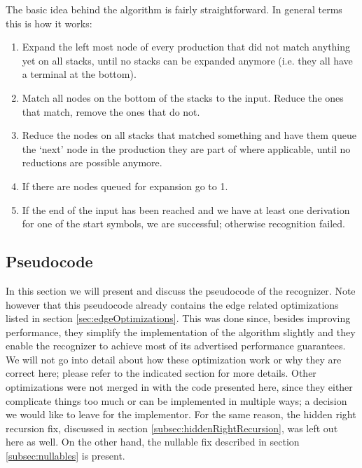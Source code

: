 \documentclass[a4paper,10pt]{article}
\begin{document}
The basic idea behind the algorithm is fairly straightforward. In general terms this is how it works:

\begin{enumerate}
 \setlength{\itemsep}{0pt}
 \setlength{\parskip}{0pt}
 \setlength{\parsep}{0pt}

 \item Expand the left most node of every production that did not match anything yet on all stacks, until no stacks can be expanded anymore (i.e. they all have a terminal at the bottom).
 \item Match all nodes on the bottom of the stacks to the input. Reduce the ones that match, remove the ones that do not.
 \item Reduce the nodes on all stacks that matched something and have them queue the `next' node in the production they are part of where applicable, until no reductions are possible anymore.
 \item If there are nodes queued for expansion go to 1.
 \item If the end of the input has been reached and we have at least one derivation for one of the start symbols, we are successful; otherwise recognition failed.
\end{enumerate}

\pagebreak
\subsection{Pseudocode}

In this section we will present and discuss the pseudocode of the recognizer. Note however that this pseudocode already contains the edge related optimizations listed in section \ref{sec:edgeOptimizations}. This was done since, besides improving performance, they simplify the implementation of the algorithm slightly and they enable the recognizer to achieve most of its advertised performance guarantees. We will not go into detail about how these optimization work or why they are correct here; please refer to the indicated section for more details. Other optimizations were not merged in with the code presented here, since they either complicate things too much or can be implemented in multiple ways; a decision we would like to leave for the implementor. For the same reason, the hidden right recursion fix, discussed in section \ref{subsec:hiddenRightRecursion}, was left out here as well. On the other hand, the nullable fix described in section \ref{subsec:nullables} is present.
\end{document}
